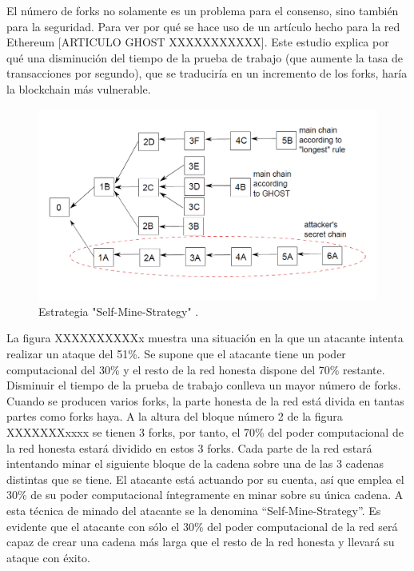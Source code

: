 El número de forks no solamente es un problema para el consenso, sino también para la seguridad. Para ver por qué se hace uso de un artículo hecho para la red Ethereum [ARTICULO GHOST XXXXXXXXXXX]. Este estudio explica por qué una disminución del tiempo de la prueba de trabajo (que aumente la tasa de transacciones por segundo), que se traduciría en un incremento de los forks, haría la blockchain más vulnerable. 

\begin{figure}
	\centering
	\includegraphics[width=1\textwidth]{imagenes/figura5.PNG}
	\caption{\label{fig1}Estrategia "Self-Mine-Strategy" \cite{ghost}.}
\end{figure}

La figura XXXXXXXXXXx muestra una situación en la que un atacante intenta realizar un ataque del 51\%. Se supone que el atacante tiene un poder computacional del 30\% y el resto de la red honesta dispone del 70\% restante. Disminuir el tiempo de la prueba de trabajo conlleva un mayor número de forks. Cuando se producen varios forks, la parte honesta de la red está divida en tantas partes como forks haya. A la altura del bloque número 2 de la figura XXXXXXXxxxx se tienen 3 forks, por tanto, el 70\% del poder computacional de la red honesta estará dividido en estos 3 forks. Cada parte de la red estará intentando minar el siguiente bloque de la cadena sobre una de las 3 cadenas distintas que se tiene. El atacante está actuando por su cuenta, así que emplea el 30\% de su poder computacional íntegramente en minar sobre su única cadena. A esta técnica de minado del atacante se la denomina “Self-Mine-Strategy”. Es evidente que el atacante con sólo el 30\% del poder computacional de la red será capaz de crear una cadena más larga que el resto de la red honesta y llevará su ataque con éxito. \\

